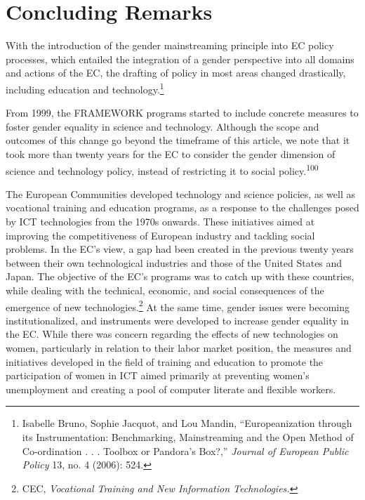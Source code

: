 \documentclass{tufte-handout}
\begin{document}
\hypertarget{concluding-remarks}{%
\section{Concluding Remarks}\label{concluding-remarks}}

With the introduction of the gender mainstreaming principle into EC
policy processes, which entailed the integration of a gender perspective
into all domains and actions of the EC, the drafting of policy in most
areas changed drastically, including education and
technology.\footnote{Isabelle Bruno, Sophie Jacquot, and Lou Mandin,
  ``Europeanization through its Instrumentation: Benchmarking,
  Mainstreaming and the Open Method of Co-ordination . . . Toolbox or
  Pandora's Box?,'' \emph{Journal of European Public Policy} 13, no. 4
  (2006): 524.}

\newpage From 1999, the FRAMEWORK programs started to include concrete measures
to foster gender equality in science and technology. Although the scope
and outcomes of this change go beyond the timeframe of this article, we
note that it took more than twenty years for the EC to consider the
gender dimension of science and technology policy, instead of
restricting it to social policy.\textsuperscript{100} 

The European Communities developed technology and science policies, as
well as vocational training and education programs, as a response to the
challenges posed by ICT technologies from the 1970s onwards. These
initiatives aimed at improving the competitiveness of European industry
and tackling social problems. In the EC's view, a gap had been created
in the previous twenty years between their own technological industries
and those of the United States and Japan. The objective of the EC's
programs was to catch up with these countries, while dealing with the
technical, economic, and social consequences of the emergence of new
technologies.\footnote{CEC, \emph{Vocational Training and New
  Information Technologies.}} At the same time, gender issues were
becoming institutionalized, and instruments were developed to increase
gender equality in the EC. While there was concern regarding the effects
of new technologies on women, particularly in relation to their labor
market position, the measures and initiatives developed in the field of
training and education to promote the participation of women in ICT
aimed primarily at preventing women's unemployment and creating a pool
of computer literate and flexible workers.
\end{document}
